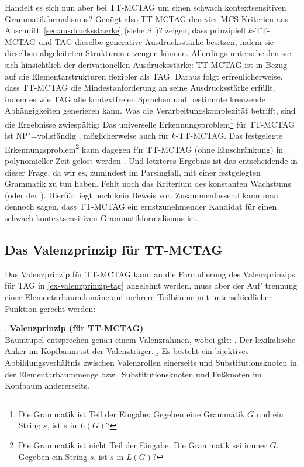 Handelt es sich nun aber bei TT-MCTAG um einen schwach kontextsensitiven Grammatikformalismus? Genügt also TT-MCTAG den vier MCS-Kriterien aus Abschnitt~\ref{sec:ausdrucksstaerke} (siehe S.\,\pageref{ex-kriterien-mcs})? \cite{Kallmeyer:Parmentier:08} zeigen, dass prinzipiell $k$-TT-MCTAG und TAG dieselbe generative Ausdrucksstärke besitzen, indem sie dieselben abgeleiteten Strukturen erzeugen können. Allerdings unterscheiden sie sich hinsichtlich der derivationellen Ausdrucksstärke: TT-MCTAG ist in Bezug auf die Elementarstrukturen flexibler als TAG. Daraus folgt erfreulicherweise, dass TT-MCTAG die Mindestanforderung an seine Ausdrucksstärke erfüllt, indem es wie TAG alle kontextfreien Sprachen und bestimmte kreuzende Abhängigkeiten generieren kann. Was die Verarbeitungskomplexität betrifft, sind die Ergebnisse zwiespältig: Das universelle Erkennungsproblem\footnote{Die Grammatik ist Teil der Eingabe: Gegeben eine Grammatik $G$ und ein String $s$, ist $s$ in $L(G)$?} für TT-MCTAG ist NP"=vollständig \citep{Sogaard:Lichte:Maier:07}, möglicherweise auch für $k$-TT-MCTAG. Das festgelegte Erkennungsproblem\footnote{Die Grammatik ist nicht Teil der  Eingabe: Die Grammatik sei immer $G$. Gegeben ein String $s$, ist $s$ in $L(G)$?} kann dagegen für TT-MCTAG (ohne Einschränkung) in polynomieller Zeit gelöst werden \citep{Kallmeyer:Satta:09}. Und letzteres Ergebnis ist das entscheidende in dieser Frage, da wir es, zumindest im Parsingfall, mit einer festgelegten Grammatik zu tun haben. Fehlt noch das Kriterium des konstanten Wachstums (oder der ). Hierfür liegt noch kein Beweis vor. Zusammenfassend kann man dennoch sagen, dass TT-MCTAG ein ernstzunehmender Kandidat für einen schwach kontextsensitiven Grammatikformalismus ist.


\subsection{Das Valenzprinzip für TT-MCTAG}

Das Valenzprinzip für TT-MCTAG kann an die Formulierung des Valenzprinzips für TAG in \ref{ex-valenzprinzip-tag} angelehnt werden, muss aber der Auf"|trennung einer Elementarbaumdomäne auf mehrere Teilbäume mit unterschiedlicher Funktion gerecht werden:

\ex. \label{ex-valenzprinzip-mctag}{\bf Valenzprinzip (für TT-MCTAG)} \\ 
Baumtupel entsprechen genau einem Valenzrahmen, wobei gilt:
\a. Der lexikalische Anker im Kopfbaum ist der Valenzträger.
\b. Es besteht ein bijektives Abbildungsverhältnis zwischen Valenzrollen einerseits und Substitutionsknoten in der Elementarbaummenge bzw.\ Substitutionsknoten und Fu\ss knoten im Kopfbaum andererseits.

